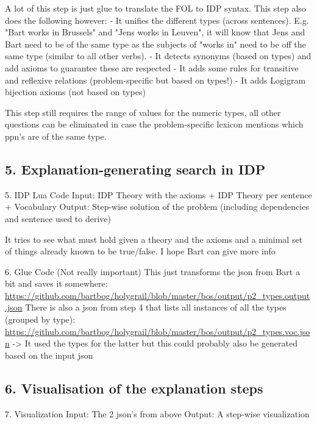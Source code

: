A lot of this step is just glue to translate the FOL to IDP syntax. This step also does the following however:
- It unifies the different types (across sentences). E.g. "Bart works in Brussels" and "Jens works in Leuven", it will know that Jens and Bart need to be of the same type as the subjects of "works in" need to be off the same type (similar to all other verbs). 
- It detects synonyms (based on types) and add axioms to guarantee these are respected
- It adds some rules for transitive and reflexive relations (problem-specific but based on types!)
- It adds Logigram bijection axioms (not based on types)

This step still requires the range of values for the numeric types, all other questions can be eliminated in case the problem-specific lexicon mentions which ppn's are of the same type.


\subsection{5. Explanation-generating search in IDP}



5. IDP Lua Code
Input: IDP Theory with the axioms + IDP Theory per sentence + Vocabulary
Output: Step-wise solution of the problem (including dependencies and sentence used to derive)

It tries to see what must hold given a theory and the axioms and a minimal set of things already known to be true/false. I hope Bart can give more info

6. Glue Code
(Not really important)
This just transforms the json from Bart a bit and saves it somewhere: \url{https://github.com/bartbog/holygrail/blob/master/bos/output/p2_types.output.json}
There is also a json from step 4 that lists all instances of all the types (grouped by type): \url{https://github.com/bartbog/holygrail/blob/master/bos/output/p2_types.voc.json}
-> It used the types for the latter but this could probably also be generated based on the input json

\subsection{6. Visualisation of the explanation steps}


7. Visualization
Input: The 2 json's from above
Output: A step-wise visualization
